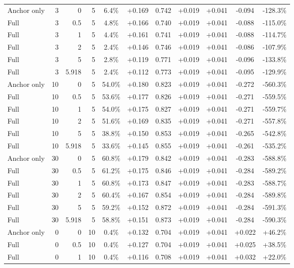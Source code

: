 \begin{table}[htbp]
\begin{tabular}{lrrrccccccc}
Anchor only & 3 & 0 & 5 & 6.4\% & +0.169 & 0.742 & +0.019 & +0.041 & -0.094 & -128.3\% \\
Full & 3 & 0.5 & 5 & 4.8\% & +0.166 & 0.740 & +0.019 & +0.041 & -0.088 & -115.0\% \\
Full & 3 & 1 & 5 & 4.4\% & +0.161 & 0.741 & +0.019 & +0.041 & -0.088 & -114.7\% \\
Full & 3 & 2 & 5 & 2.4\% & +0.146 & 0.746 & +0.019 & +0.041 & -0.086 & -107.9\% \\
Full & 3 & 5 & 5 & 2.8\% & +0.119 & 0.771 & +0.019 & +0.041 & -0.096 & -133.8\% \\
Full & 3 & 5.918 & 5 & 2.4\% & +0.112 & 0.773 & +0.019 & +0.041 & -0.095 & -129.9\% \\
Anchor only & 10 & 0 & 5 & 54.0\% & +0.180 & 0.823 & +0.019 & +0.041 & -0.272 & -560.3\% \\
Full & 10 & 0.5 & 5 & 53.6\% & +0.177 & 0.826 & +0.019 & +0.041 & -0.271 & -559.5\% \\
Full & 10 & 1 & 5 & 54.0\% & +0.175 & 0.827 & +0.019 & +0.041 & -0.271 & -559.7\% \\
Full & 10 & 2 & 5 & 51.6\% & +0.169 & 0.835 & +0.019 & +0.041 & -0.271 & -557.8\% \\
Full & 10 & 5 & 5 & 38.8\% & +0.150 & 0.853 & +0.019 & +0.041 & -0.265 & -542.8\% \\
Full & 10 & 5.918 & 5 & 33.6\% & +0.145 & 0.855 & +0.019 & +0.041 & -0.261 & -535.2\% \\
Anchor only & 30 & 0 & 5 & 60.8\% & +0.179 & 0.842 & +0.019 & +0.041 & -0.283 & -588.8\% \\
Full & 30 & 0.5 & 5 & 61.2\% & +0.175 & 0.846 & +0.019 & +0.041 & -0.284 & -589.2\% \\
Full & 30 & 1 & 5 & 60.8\% & +0.173 & 0.847 & +0.019 & +0.041 & -0.283 & -588.7\% \\
Full & 30 & 2 & 5 & 60.4\% & +0.167 & 0.854 & +0.019 & +0.041 & -0.284 & -589.8\% \\
Full & 30 & 5 & 5 & 59.2\% & +0.152 & 0.872 & +0.019 & +0.041 & -0.284 & -591.3\% \\
Full & 30 & 5.918 & 5 & 58.8\% & +0.151 & 0.873 & +0.019 & +0.041 & -0.284 & -590.3\% \\
Anchor only & 0 & 0 & 10 & 0.4\% & +0.132 & 0.704 & +0.019 & +0.041 & +0.022 & +46.2\% \\
Full & 0 & 0.5 & 10 & 0.4\% & +0.127 & 0.704 & +0.019 & +0.041 & +0.025 & +38.5\% \\
Full & 0 & 1 & 10 & 0.4\% & +0.116 & 0.708 & +0.019 & +0.041 & +0.032 & +22.0\% \\

\end{tabular}
\end{table}
